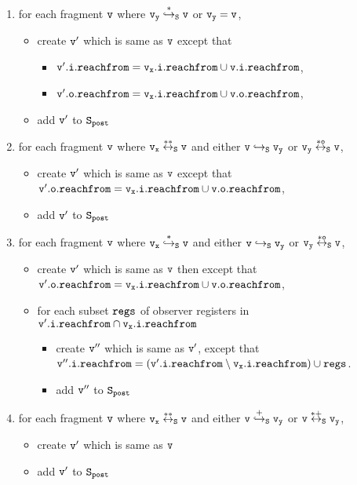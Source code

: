 \begin{itemize}
\begin{enumerate}
\item for each fragment $\tt v$ where $\tt v_y \overset{*}\hookrightarrow_S v$ or $\tt v_y = v$, 
\begin{itemize}
	\item create  $\tt v'$ which is same as $\tt v$ except that
\begin{itemize}
 \item $\tt \tt v'.i.reachfrom = v_x.i.reachfrom \cup \tt v.i.reachfrom$, 
\item $\tt \tt v'.o.reachfrom = v_x.i.reachfrom \cup \tt v.o.reachfrom$, 
\end{itemize}
\item add $\tt v'$ to $\tt S_{post}$
\end{itemize}
\item for each fragment $\tt v$ where $\tt v_x \overset{**}\leftrightarrow_S v$ and either $\tt v \hookrightarrow_S v_y$ or $\tt v_y \overset{*o}\leftrightarrow_S v$, 
\begin{itemize}
\item  create $\tt v'$ which is same as $\tt v$ except that $\tt \tt v'.o.reachfrom = v_x.i.reachfrom \cup \tt v.o.reachfrom$, 
 \item add $\tt v'$ to $\tt S_{post}$ 
\end{itemize}


\item for each fragment $\tt v$ where $\tt v_x \overset{*}\hookrightarrow_S v$ and either $\tt v \hookrightarrow_S v_y$ or $\tt v_y \overset{*o}\leftrightarrow_S v$,  
\begin{itemize}
\item create $\tt v'$ which is same as $\tt v$ then except that $\tt \tt v'.o.reachfrom = v_x.i.reachfrom \cup \tt v.o.reachfrom$, 
\item for each subset $\tt regs$ of observer registers in $\tt v'.i.reachfrom \cap \tt v_x.i.reachfrom$
\begin{itemize}
\item create $\tt v''$ which is same as $\tt v'$, except that $\tt v''.i.reachfrom = (\tt v'.i.reachfrom \setminus v_x.i.reachfrom) \cup regs$.
\item add $\tt v''$ to $\tt S_{post}$
\end{itemize}
\end{itemize}

\item for each fragment $\tt v$ where $\tt v_x \overset{**}\leftrightarrow_S v$ and either $\tt v \overset{+}\hookrightarrow_S v_y$ or $\tt v \overset{*+}\leftrightarrow_S v_y$, 
\begin{itemize}
\item create $\tt v'$ which is same as $\tt v$
\item  add $\tt v'$ to $\tt S_{post}$
\end{itemize}



\end{enumerate}
\end{itemize}
